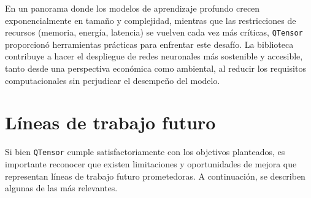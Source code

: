 En un panorama donde los modelos de aprendizaje profundo crecen exponencialmente en tamaño y complejidad, mientras que las restricciones de recursos (memoria, energía, latencia) se vuelven cada vez más críticas, \texttt{QTensor} proporcionó herramientas prácticas para enfrentar este desafío. La biblioteca contribuye a hacer el despliegue de redes neuronales más sostenible y accesible, tanto desde una perspectiva económica como ambiental, al reducir los requisitos computacionales sin perjudicar el desempeño del modelo.

\section{Líneas de trabajo futuro}

Si bien \texttt{QTensor} cumple satisfactoriamente con los objetivos planteados, es importante reconocer que existen limitaciones y oportunidades de mejora que representan líneas de trabajo futuro prometedoras. A continuación, se describen algunas de las más relevantes.





